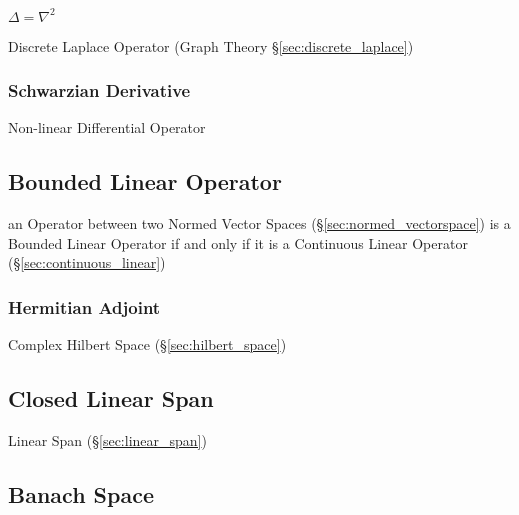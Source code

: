$\Delta = \nabla^2$

Discrete Laplace Operator (Graph Theory \S\ref{sec:discrete_laplace})



\subsubsection{Schwarzian Derivative}\label{sec:schwarzian_derivative}

Non-linear Differential Operator



\subsection{Bounded Linear Operator}\label{sec:bounded_linear_operator}

an Operator between two Normed Vector Spaces
(\S\ref{sec:normed_vectorspace}) is a Bounded Linear Operator if and
only if it is a Continuous Linear Operator
(\S\ref{sec:continuous_linear})



\subsubsection{Hermitian Adjoint}\label{sec:hermitian_adjoint}

Complex Hilbert Space (\S\ref{sec:hilbert_space})



\subsection{Closed Linear Span}\label{sec:closed_linear_span}

Linear Span (\S\ref{sec:linear_span})



\subsection{Banach Space}\label{sec:banach_space}

